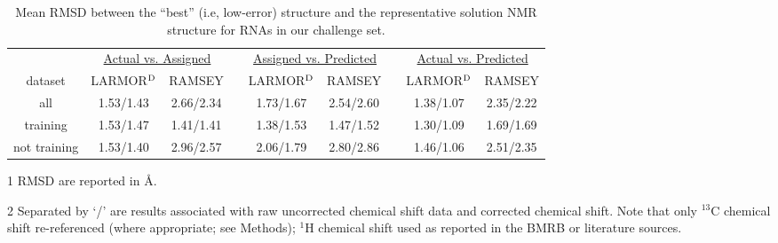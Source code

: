 \documentclass[journal=jcisd8,manuscript=article,layout=onecolumn]{achemso}
\begin{document}
\begin{table}[h!]
\centering
\caption{Mean RMSD between the ``best'' (i.e, low-error) structure and the representative solution NMR structure for RNAs in our challenge set.}
\begin{threeparttable}
\begin{tabular}{*9c}
\toprule
{} & \multicolumn{2}{c}{\underline{Actual vs. Assigned}} & {} & \multicolumn{2}{c}{\underline{Assigned vs. Predicted}} & {} & \multicolumn{2}{c}{\underline{Actual vs. Predicted}} \\
dataset & LARMOR$^{\rm D}$   & RAMSEY   & {} & LARMOR$^{\rm D}$  & RAMSEY   & {} & LARMOR$^{\rm D}$    & RAMSEY \\

\hline
all & 1.53/1.43 & 2.66/2.34 & {} & 1.73/1.67 & 2.54/2.60 & {} &  1.38/1.07 & 2.35/2.22 \\
training & 1.53/1.47 & 1.41/1.41 & {} & 1.38/1.53 & 1.47/1.52 & {} &  1.30/1.09 & 1.69/1.69 \\
not training & 1.53/1.40 & 2.96/2.57 & {} & 2.06/1.79 & 2.80/2.86 & {} &  1.46/1.06 & 2.51/2.35 \\
\hline
\end{tabular}
\begin{tablenotes}
\item[1] RMSD are reported in \AA.
\item[2] Separated by `/' are  results associated with raw uncorrected chemical shift data and corrected chemical shift. Note that only $^{13}$C chemical shift re-referenced (where appropriate; see Methods); $^{1}$H chemical shift used as reported in the BMRB or literature sources.  
\end{tablenotes}
\end{threeparttable}
\label{tab:meanrsmd} 
\end{table}
\end{document}
